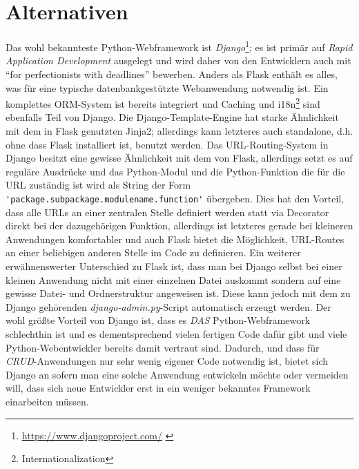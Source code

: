 \section{Alternativen}
Das wohl bekannteste Python-Webframework ist
\emph{Django}\footnote{\href{https://www.djangoproject.com/}{https://www.djangoproject.com/}
\citep{django}}; es
ist primär auf \emph{Rapid Application Development} ausgelegt und wird daher von den Entwicklern
auch mit \enquote{for perfectionists with deadlines} bewerben. Anders als Flask enthält es alles, was
für eine typische datenbankgestützte Webanwendung notwendig ist. Ein komplettes ORM-System ist
bereits integriert und Caching und i18n\footnote{Internationalization} sind ebenfalls Teil von
Django. Die Django-Template-Engine hat starke Ähnlichkeit mit dem in Flask genutzten Jinja2;
allerdings kann letzteres auch standalone, d.h. ohne dass Flask installiert ist, benutzt werden. Das
URL-Routing-System in Django besitzt eine gewisse Ähnlichkeit mit dem von Flask, allerdings setzt es
auf reguläre Ausdrücke und das Python-Modul und die Python-Funktion die für die URL zuständig ist
wird als String der Form \lstinline{'package.subpackage.modulename.function'} übergeben. Dies hat
den Vorteil, dass alle URLs an einer zentralen Stelle definiert werden statt via Decorator direkt
bei der dazugehörigen Funktion, allerdings ist letzteres gerade bei kleineren Anwendungen
komfortabler und auch Flask bietet die Möglichkeit, URL-Routes an einer beliebigen anderen Stelle im
Code zu definieren. Ein weiterer erwähnenswerter Unterschied zu Flask ist, dass man bei Django
selbst bei einer kleinen Anwendung nicht mit einer einzelnen Datei auskommt sondern auf eine gewisse
Datei- und Ordnerstruktur angeweisen ist. Diese kann jedoch mit dem zu Django gehörenden
\emph{django-admin.py}-Script automatisch erzeugt werden. Der wohl größte Vorteil von Django ist,
dass es \emph{DAS} Python-Webframework schlechthin ist und es dementsprechend vielen fertigen Code
dafür gibt und viele Python-Webentwickler bereits damit vertraut sind. Dadurch, und dass für
\emph{CRUD}-Anwendungen nur sehr wenig eigener Code notwendig ist, bietet sich Django an sofern man
eine solche Anwendung entwickeln möchte oder vermeiden will, dass sich neue Entwickler erst in ein
weniger bekanntes Framework einarbeiten müssen.


